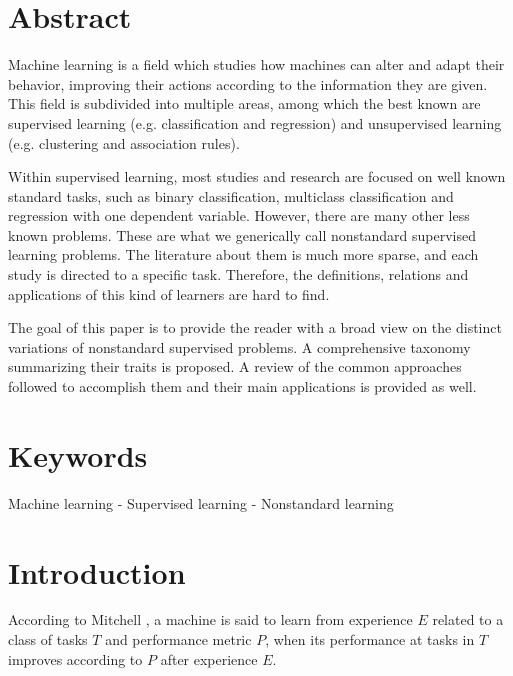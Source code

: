 
\setchapterpreamble[u]{\margintoc}
\label{ch:paper3}

  \section*{Abstract}
Machine learning is a field which studies how machines can alter and adapt their behavior, improving their actions according to the information they are given. This field is subdivided into multiple areas, among which the best known are supervised learning (e.g. classification and regression) and unsupervised learning (e.g. clustering and association rules).

Within supervised learning, most studies and research are focused on well known standard tasks, such as binary classification, multiclass classification and regression with one dependent variable. However, there are many other less known problems. These are what we generically call nonstandard supervised learning problems. The literature about them is much more sparse, and each study is directed to a specific task. Therefore, the definitions, relations and applications of this kind of learners are hard to find.

The goal of this paper is to provide the reader with a broad view on the distinct variations of nonstandard supervised problems. A comprehensive taxonomy summarizing their traits is proposed. A review of the common approaches followed to accomplish them and their main applications is provided as well.

\section*{Keywords}
Machine learning - Supervised learning - Nonstandard learning

\section{Introduction}
\label{p3intro}

According to Mitchell , a machine is said to learn from experience $E$ related to a class of tasks $T$ and performance metric $P$, when its performance at tasks in $T$  improves according to $P$ after experience $E$.

